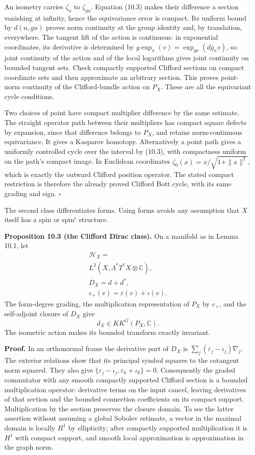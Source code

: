 \documentclass[
  11pt,
]{article}
\begin{document}
An isometry carries \(\zeta_u\) to \(\zeta_{gu}\). Equation (10.3) makes
their difference a section vanishing at infinity, hence the equivariance
error is compact. Its uniform bound by \(d(u,gu)\) proves norm
continuity at the group identity and, by translation, everywhere. The
tangent lift of the action is continuous: in exponential coordinates,
its derivative is determined by \(g\exp_x(v)=\exp_{gx}(d g_x v)\), so
joint continuity of the action and of the local logarithms gives joint
continuity on bounded tangent sets. Check compactly supported Clifford
sections on compact coordinate sets and then approximate an arbitrary
section. This proves point-norm continuity of the Clifford-bundle action
on \(P_X\). These are all the equivariant cycle conditions.

Two choices of point have compact multiplier difference by the same
estimate. The straight operator path between their multipliers has
compact square defects by expansion, since that difference belongs to
\(P_X\), and retains norm-continuous equivariance. It gives a Kasparov
homotopy. Alternatively a point path gives a uniformly controlled cycle
over the interval by (10.3), with compactness uniform on the path's
compact image. In Euclidean coordinates
\(\zeta_0(x)=x/\sqrt{1+\|x\|^2}\), which is exactly the outward Clifford
position operator. The stated compact restriction is therefore the
already proved Clifford Bott cycle, with its same grading and sign.
\(\square\)

The second class differentiates forms. Using forms avoids any assumption
that \(X\) itself has a spin or spin\(^{c}\) structure.

\textbf{Proposition 10.3 (the Clifford Dirac class).} On a manifold as
in Lemma 10.1, let \[
\begin{gathered}
\mathcal H_X=\\
L^2(X,\Lambda^*T^*X\otimes\mathbb C),\\
D_X=d+d^*,\\
c_+(v)=\varepsilon(v)+\iota(v).
\end{gathered}
\tag{10.7}
\] The form-degree grading, the multiplication representation of \(P_X\)
by \(c_+\), and the self-adjoint closure of \(D_X\) give \[
d_X\in KK^G(P_X,\mathbb C).
\tag{10.8}
\] The isometric action makes its bounded transform exactly invariant.

\textbf{Proof.} In an orthonormal frame the derivative part of \(D_X\)
is \(\sum_j(\varepsilon_j-\iota_j)\nabla_j\). The exterior relations
show that its principal symbol squares to the cotangent norm squared.
They also give \(\{\varepsilon_j-\iota_j,\varepsilon_k+\iota_k\}=0\).
Consequently the graded commutator with any smooth compactly supported
Clifford section is a bounded multiplication operator: derivative terms
on the input cancel, leaving derivatives of that section and the bounded
connection coefficients on its compact support. Multiplication by the
section preserves the closure domain. To see the latter assertion
without assuming a global Sobolev estimate, a vector in the maximal
domain is locally \(H^1\) by ellipticity; after compactly supported
multiplication it is \(H^1\) with compact support, and smooth local
approximation is approximation in the graph norm.
\end{document}
